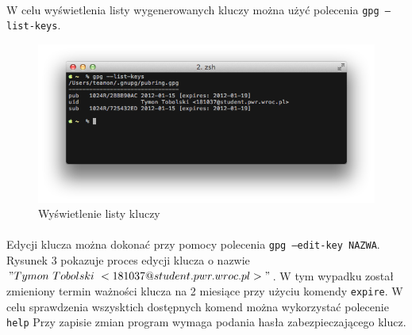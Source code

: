 \documentclass[wide,a4paper,titlepage,12pt] {article}
\begin{document}
  \paragraph{}
  W celu wyświetlenia listy wygenerowanych kluczy można użyć polecenia \texttt{gpg --list-keys}.

  \begin{figure}[h!]
    \begin{center}
      \includegraphics[width=\textwidth]{img/2.png}
      \caption{Wyświetlenie listy kluczy}
    \end{center}
  \end{figure}

  \paragraph{}
  Edycji klucza można dokonać przy pomocy polecenia \texttt{gpg --edit-key NAZWA}. Rysunek 3 pokazuje proces edycji klucza o nazwie $"Tymon\ Tobolski\ <181037@student.pwr.wroc.pl>"$. W tym wypadku został zmieniony termin ważności klucza na 2 miesiące przy użyciu komendy \texttt{expire}. W celu sprawdzenia wszysktich dostępnych komend można wykorzystać polecenie \texttt{help} Przy zapisie zmian program wymaga podania hasła zabezpieczającego klucz.
\end{document}
